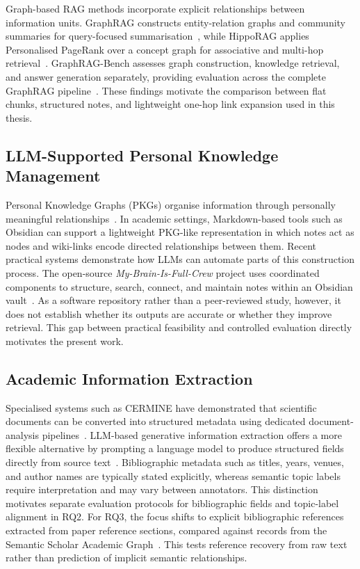 \documentclass[runningheads]{llncs}
\begin{document}
Graph-based RAG methods incorporate explicit relationships between
information units. GraphRAG constructs entity-relation graphs and
community summaries for query-focused
summarisation~\cite{edge2024local}, while HippoRAG applies Personalised
PageRank over a concept graph for associative and multi-hop
retrieval~\cite{gutierrez2024hipporag}. GraphRAG-Bench assesses graph
construction, knowledge retrieval, and answer generation separately,
providing evaluation across the complete GraphRAG
pipeline~\cite{xiao2025graphragbench}. These findings motivate the
comparison between flat chunks, structured notes, and lightweight
one-hop link expansion used in this thesis.

\subsection{LLM-Supported Personal Knowledge Management}

Personal Knowledge Graphs (PKGs) organise information through
personally meaningful relationships~\cite{balog2019personal}. In
academic settings, Markdown-based tools such as Obsidian can support a
lightweight PKG-like representation in which notes act as nodes and
wiki-links encode directed relationships between them. Recent practical
systems demonstrate how LLMs can automate parts of this construction
process. The open-source \textit{My-Brain-Is-Full-Crew} project uses
coordinated components to structure, search, connect, and maintain
notes within an Obsidian vault~\cite{mybrainisfullcrew}. As a software
repository rather than a peer-reviewed study, however, it does not
establish whether its outputs are accurate or whether they improve
retrieval. This gap between practical feasibility and controlled
evaluation directly motivates the present work.

\subsection{Academic Information Extraction}

Specialised systems such as CERMINE have demonstrated that scientific
documents can be converted into structured metadata using dedicated
document-analysis pipelines~\cite{tkaczyk2015cermine}. LLM-based
generative information extraction offers a more flexible alternative
by prompting a language model to produce structured fields directly
from source text~\cite{xu2024large}. Bibliographic metadata such as
titles, years, venues, and author names are typically stated
explicitly, whereas semantic topic labels require interpretation and
may vary between annotators. This distinction motivates separate
evaluation protocols for bibliographic fields and topic-label alignment
in RQ2. For RQ3, the focus shifts to explicit bibliographic references
extracted from paper reference sections, compared against records from
the Semantic Scholar Academic Graph~\cite{kinney2023semantic}. This
tests reference recovery from raw text rather than prediction of
implicit semantic relationships.
\end{document}
